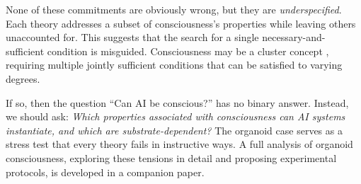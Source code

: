 None of these commitments are obviously wrong, but they are \emph{underspecified}. Each
theory addresses a subset of consciousness's properties while leaving others unaccounted for.
This suggests that the search for a single necessary-and-sufficient condition is misguided.
Consciousness may be a cluster concept \cite{butlin2023consciousness}, requiring multiple
jointly sufficient conditions that can be satisfied to varying degrees.

If so, then the question ``Can AI be conscious?'' has no binary answer. Instead, we should
ask: \emph{Which properties associated with consciousness can AI systems instantiate, and
which are substrate-dependent?} The organoid case serves as a stress test that every theory
fails in instructive ways. A full analysis of organoid consciousness, exploring these tensions
in detail and proposing experimental protocols, is developed in a companion paper.

